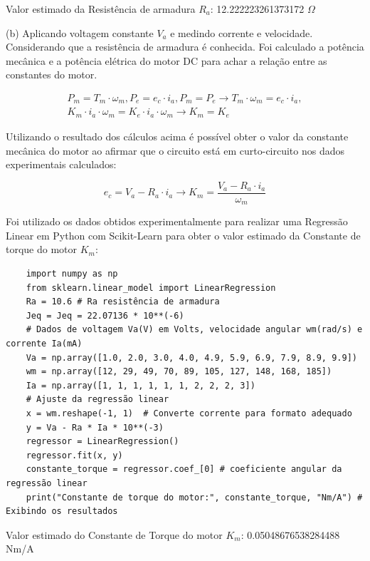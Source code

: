 \documentclass[10pt]{article}
\begin{document}
Valor estimado da Resistência de armadura $R_a$: 12.222223261373172 $\Omega$

\quad (b) Aplicando voltagem constante $V_a$ e medindo corrente e velocidade.
Considerando que a resistência de armadura é conhecida. Foi calculado a potência
mecânica e a potência elétrica do motor DC para achar a relação entre as constantes
do motor.

\begin{equation}
\begin{aligned}
    P_m = T_m \cdot \omega_m, P_e = e_c \cdot i_a, P_m = P_e \rightarrow T_m \cdot \omega_m = e_c \cdot i_a, \\
    K_m \cdot i_a \cdot \omega_m = K_e \cdot i_a \cdot \omega_m \rightarrow K_m = K_e
\end{aligned}
\end{equation}

\quad Utilizando o resultado dos cálculos acima é possível obter o valor da constante mecânica do motor ao afirmar
que o circuito está em curto-circuito nos dados experimentais calculados:

\begin{equation}
    e_c = V_a - R_a \cdot i_a \rightarrow K_m = \frac{V_a - R_a \cdot i_a}{\omega_m}
\end{equation}

\quad Foi utilizado os dados obtidos
experimentalmente para realizar uma Regressão Linear em Python com Scikit-Learn
para obter o valor estimado da Constante de torque do motor $K_m$:

\begin{verbatim}
    import numpy as np
    from sklearn.linear_model import LinearRegression
    Ra = 10.6 # Ra resistência de armadura
    Jeq = Jeq = 22.07136 * 10**(-6)
    # Dados de voltagem Va(V) em Volts, velocidade angular wm(rad/s) e corrente Ia(mA)
    Va = np.array([1.0, 2.0, 3.0, 4.0, 4.9, 5.9, 6.9, 7.9, 8.9, 9.9])
    wm = np.array([12, 29, 49, 70, 89, 105, 127, 148, 168, 185])
    Ia = np.array([1, 1, 1, 1, 1, 1, 2, 2, 2, 3])
    # Ajuste da regressão linear
    x = wm.reshape(-1, 1)  # Converte corrente para formato adequado
    y = Va - Ra * Ia * 10**(-3)
    regressor = LinearRegression()
    regressor.fit(x, y)
    constante_torque = regressor.coef_[0] # coeficiente angular da regressão linear
    print("Constante de torque do motor:", constante_torque, "Nm/A") # Exibindo os resultados
\end{verbatim}

\quad Valor estimado do Constante de Torque do motor $K_m$: 0.05048676538284488 Nm/A
\end{document}
